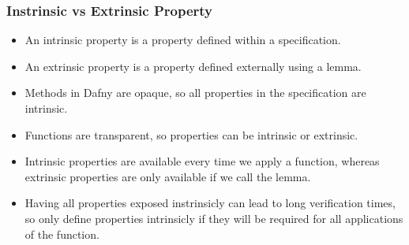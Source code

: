 \subsubsection{Instrinsic vs Extrinsic Property}
\begin{itemize}
        \item An intrinsic property is a property defined within a specification.
        \item An extrinsic property is a property defined externally using a lemma.
        \item Methods in Dafny are opaque, so all properties in the specification are intrinsic.
        \item Functions are transparent, so properties can be intrinsic or extrinsic.
        \item Intrinsic properties are available every time we apply a function, whereas extrinsic properties are only available if we call the lemma.
        \item Having all properties exposed instrinsicly can lead to long verification times, so only define properties intrinsicly if they will be required for all applications of the function.
\end{itemize}